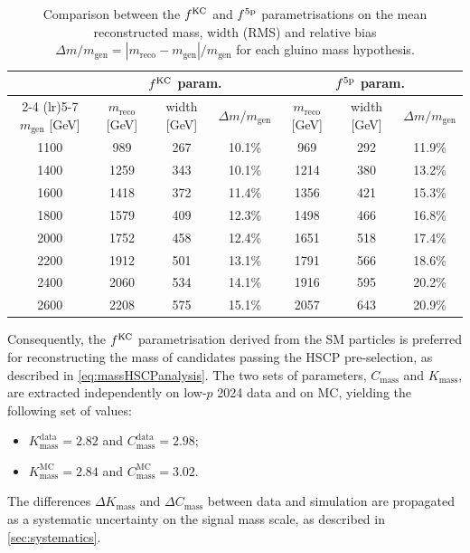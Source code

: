 \begin{table}[h!]
\centering
\footnotesize
\renewcommand{\arraystretch}{1.4}
\begin{tabular}{c| ccc ccc}
\toprule
& \multicolumn{3}{c}{$f^{\rm KC}$ param.} & \multicolumn{3}{c}{$f^{\rm 5p}$ param.} \\
\cmidrule(lr){2-4} \cmidrule(lr){5-7}
$m_{\text{gen}}$ [GeV] & $m_{\text{reco}}$ [GeV] & width [GeV] & $\Delta m / m_{\text{gen}}$ & $m_{\text{reco}}$ [GeV] & width [GeV] & $\Delta m / m_{\text{gen}}$ \\
\midrule
1100 & 989  & 267 & 10.1\% & 969  & 292 & 11.9\% \\
1400 & 1259 & 343 & 10.1\% & 1214 & 380 & 13.2\% \\
1600 & 1418 & 372 & 11.4\% & 1356 & 421 & 15.3\% \\
1800 & 1579 & 409 & 12.3\% & 1498 & 466 & 16.8\% \\
2000 & 1752 & 458 & 12.4\% & 1651 & 518 & 17.4\% \\
2200 & 1912 & 501 & 13.1\% & 1791 & 566 & 18.6\% \\
2400 & 2060 & 534 & 14.1\% & 1916 & 595 & 20.2\% \\
2600 & 2208 & 575 & 15.1\% & 2057 & 643 & 20.9\% \\
\bottomrule
\end{tabular}
\caption{Comparison between the $f^{\rm KC}$ and $f^{\rm 5p}$ parametrisations on the mean reconstructed mass, width (RMS) and relative bias $\Delta m / m_{\text{gen}} = |m_{\text{reco}} - m_{\text{gen}}| / m_{\text{gen}}$ for each gluino mass hypothesis.}
\label{tab:mass_resolution}
\end{table}

\newpage

Consequently, the $f^{\rm KC}$ parametrisation derived from the SM particles is preferred for reconstructing the mass of candidates passing the HSCP pre-selection, as described in \cref{eq:massHSCPanalysis}. The two sets of parameters, $C_\textrm{mass}$ and $K_\textrm{mass}$, are extracted independently on low-$p$ 2024 data and on MC, yielding the following set of values:

\begin{itemize}
    \item $K_\textrm{mass}^\textrm{data}=2.82$ and $C_\textrm{mass}^\textrm{data}=2.98$;
    \item $K_\textrm{mass}^\textrm{MC}=2.84$ and $C_\textrm{mass}^\textrm{MC}=3.02$.
\end{itemize}
The differences $\Delta K_\textrm{mass}$ and $\Delta C_\textrm{mass}$ between data and simulation are propagated as a systematic uncertainty on the signal mass scale, as described in
\cref{sec:systematics}.


